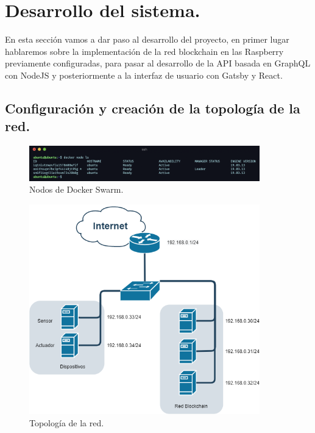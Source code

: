 \section{Desarrollo del sistema.}

En esta sección vamos a dar paso al desarrollo del proyecto, en primer lugar hablaremos sobre la implementación de la red
blockchain en las Raspberry previamente configuradas, para pasar al desarrollo de la API basada en GraphQL con NodeJS y 
posteriormente a la interfaz de usuario con Gatsby y React.  

\subsection{Configuración y creación de la topología de la red.}

\begin{figure}[ht!]
  \centering
  \includegraphics[width=10cm]{imagenes/desarrollo/comandos/node_ls_worker}
  \caption{Nodos de Docker Swarm.}
  \label{fig:node-ls-worker}
\end{figure}

\begin{figure}[ht!]
  \centering
  \includegraphics[width=10cm]{imagenes/desarrollo/topologia_red}
  \caption{Topología de la red.}
  \label{fig:topologia-red}
\end{figure}


